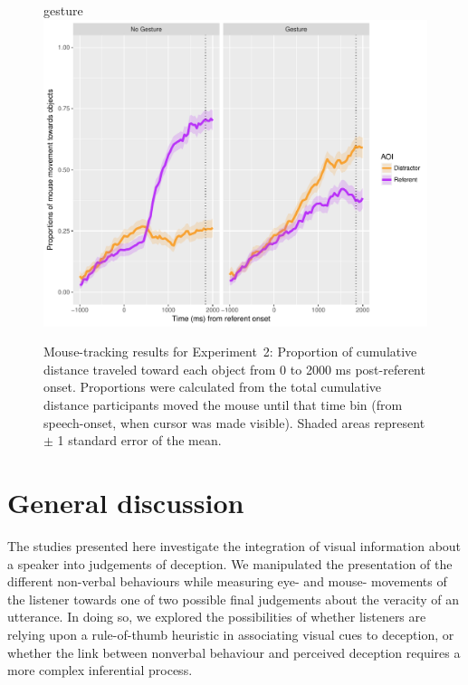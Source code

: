 \documentclass[a4paper,man,natbib]{apa6}
\begin{document}
\begin{figure}[Ht]gesture
  \centering
	\includegraphics[width=\linewidth]{./img/e8_mouset.pdf}
  \caption{Mouse-tracking results for Experiment~2: Proportion of cumulative distance traveled toward each object from 0 to 2000 ms post-referent onset. Proportions were calculated from the total cumulative distance participants moved the mouse until that time bin (from speech-onset, when cursor was made visible). Shaded areas represent $\pm$ 1 standard error of the mean.}
  \label{fig:v2_mouse}
\end{figure}


\section{General discussion}
The studies presented here investigate the integration of visual information about a speaker into judgements of deception.
We manipulated the presentation of the different non-verbal behaviours while measuring eye- and mouse- movements of the listener towards one of two possible final judgements about the veracity of an utterance.
In doing so, we explored the possibilities of whether listeners are relying upon a rule-of-thumb heuristic in associating visual cues to deception, or whether the link between nonverbal behaviour and perceived deception requires a more complex inferential process.
\end{document}
